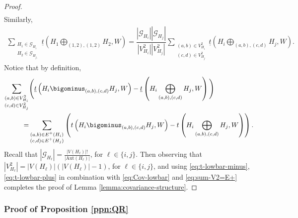 \documentclass[11pt,reqno]{amsart}
\numberwithin{equation}{section}
\theoremstyle{definition}
\begin{document}
\begin{proof}
\begin{align}
\end{align}
Similarly, 
\begin{align}\label{eq:t-lowbar-plus}
    \sum_{\substack{H_{1}\in\mathscr{G}_{H_{i}}\\ H_{2}\in\mathscr{G}_{H_{j,}}}}\underline{t}\left(H_{1}\bigoplus_{(1,2),(1,2)}H_{2},W\right) = \dfrac{|\mathscr{G}_{H_{i}}||\mathscr{G}_{H_{j}}|}{|V_{H_{i}}^{2}||V_{H_{j}}^{2}|}\sum_{\substack{(a,b)\in V_{H_{i}}^{2}\\(c,d)\in V_{H_{j}}^{2}}}\underline{t}\left(H_{i}\bigoplus_{(a,b),(c,d)}H_{j},W\right) . 
\end{align}
Notice that by definition,
\begin{align}\label{eq:sum-V2=E+}
    \sum_{\substack{(a,b)\in V_{H_{i}}^{2}\\(c,d)\in V_{H_{j}}^{2}}}
    &\Bigg(\underline{t}\left(H_{i}\bigominus_{(a,b),(c,d)}H_{j},W\right)
    -\underline{t}\left(H_{i}\bigoplus_{(a,b),(c,d)}H_{j},W\right)\Bigg)\nonumber\\
    =& \sum_{\substack{(a,b)\in E^{+}(H_{i})\\(c,d)\in E^{+}(H_{j})}}\left(t\left(H_{i}\bigominus_{(a,b),(c,d)}H_{j},W\right)
    -t\left(H_{i}\bigoplus_{(a,b),(c,d)}H_{j},W\right)\right) . 
\end{align}
Recall that $|\mathscr{G}_{H_{\ell}}| = \frac{|V(H_{\ell})|!}{|\mathrm{Aut}(H_{\ell})|}$, for $\ell \in \{ i,j\}$.
Then observing that $|V_{H_{\ell}}^{2}| = |V(H_{\ell})|(|V(H_{\ell})|-1)$, for $\ell \in \{i,j\}$, and using \eqref{eq:t-lowbar-minus}, \eqref{eq:t-lowbar-plus} in combination with \eqref{eq:Cov-lowbar} and \eqref{eq:sum-V2=E+} completes the proof of Lemma \ref{lemma:covariance-structure}. 
\end{proof}





\subsubsection{Proof of Proposition \ref{ppn:QR}} 
\label{sec:QRpf} 
\end{document}
